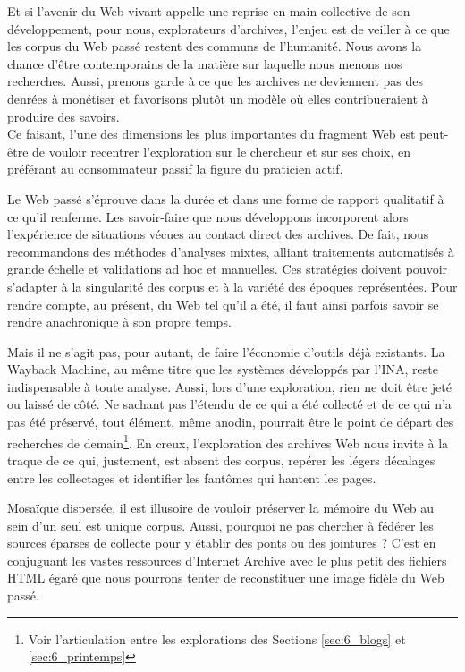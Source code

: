 \documentclass[symmetric,justified,marginals=raggedouter]{tufte-book}
\begin{document}
Et si l'avenir du Web vivant appelle une reprise en main collective de son développement, pour nous, explorateurs d'archives, l'enjeu est de veiller à ce que les corpus du Web passé restent des communs de l'humanité. Nous avons la chance d'être contemporains de la matière sur laquelle nous menons nos recherches. Aussi, prenons garde à ce que les archives ne deviennent pas des denrées à monétiser et favorisons plutôt un modèle où elles contribueraient à produire des savoirs. \\

\noindent Ce faisant, l'une des dimensions les plus importantes du fragment Web est peut-être de vouloir recentrer l'exploration sur le chercheur et sur ses choix, en préférant au consommateur passif la figure du praticien actif. 

Le Web passé s'éprouve dans la durée et dans une forme de rapport qualitatif à ce qu'il renferme. Les savoir-faire que nous développons incorporent alors l'expérience de situations vécues au contact direct des archives. De fait, nous recommandons des méthodes d'analyses mixtes, alliant traitements automatisés à grande échelle et validations ad hoc et manuelles. Ces stratégies doivent pouvoir s'adapter à la singularité des corpus et à la variété des époques représentées. Pour rendre compte, au présent, du Web tel qu'il a été, il faut ainsi parfois savoir se rendre anachronique à son propre temps.

Mais il ne s'agit pas, pour autant, de faire l'économie d'outils déjà existants. La Wayback Machine, au même titre que les systèmes développés par l'INA, reste indispensable à toute analyse. Aussi, lors d'une exploration, rien ne doit être jeté ou laissé de côté. Ne sachant pas l'étendu de ce qui a été collecté et de ce qui n'a pas été préservé, tout élément, même anodin, pourrait être le point de départ des recherches de demain\footnote{\RaggedOuter Voir l'articulation entre les explorations des Sections \ref{sec:6_blogs} et \ref{sec:6_printemps}}. En creux, l'exploration des archives Web nous invite à la traque de ce qui, justement, est absent des corpus, repérer les légers décalages entre les collectages et identifier les fantômes qui hantent les pages.

Mosaïque dispersée, il est illusoire de vouloir préserver la mémoire du Web au sein d'un seul est unique corpus. Aussi, pourquoi ne pas chercher à fédérer les sources éparses de collecte pour y établir des ponts ou des jointures ? C'est en conjuguant les vastes ressources d'Internet Archive avec le plus petit des fichiers HTML égaré que nous pourrons tenter de reconstituer une image fidèle du Web passé. 
\end{document}
